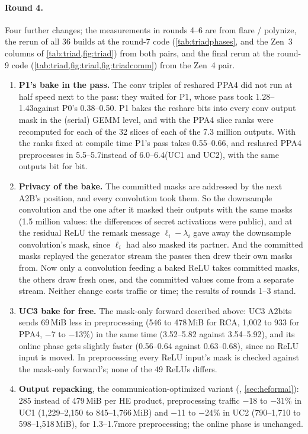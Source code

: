 \paragraph{Round 4.}\label{sec:triadround4} Four further changes; the measurements in rounds 4--6 are from flare /
polynize, the rerun of all 36 builds at the round-7 code (\cref{tab:triadphases}, and the Zen~3 columns of
\cref{tab:triad,fig:triad}) from both pairs, and the final rerun at the round-9 code (\cref{tab:triad,fig:triad,fig:triadcomm})
from the Zen~4 pair.
\begin{enumerate}\itemsep1pt
\item \textbf{P1's bake in the pass.} The conv triples of reshared PPA4 did not run at half speed next to the pass:
  they waited for P1, whose pass took 1.28--1.43\s against P0's 0.38--0.50\s. P1 bakes the reshare bits into every
  conv output mask in the (serial) GEMM level, and with  the PPA4 slice ranks were
  recomputed for each of the 32 slices of each of the 7.3 million outputs. With the ranks fixed at compile time P1's
  pass takes 0.55--0.66\s, and reshared PPA4 preprocesses in 5.5--5.7\s instead of 6.0--6.4\s (UC1 and UC2), with the
  same outputs bit for bit.
\item \textbf{Privacy of the bake.} The committed masks are addressed by the next A2B's position, and every
  convolution took them. So the downsample convolution and the one after it masked their outputs with the same masks
  (1.5 million values: the differences of secret activations were public), and at the residual ReLU the remask
  message $\ell_i - \lambda_i$ gave away the downsample convolution's mask, since $\ell_i$ had also masked its
  partner. And the committed masks replayed the generator stream the passes then drew their own masks from. Now only
  a convolution feeding a baked ReLU takes committed masks, the others draw fresh ones, and the committed values come
  from a separate stream. Neither change costs traffic or time; the results of rounds 1--3 stand.
\item \textbf{UC3 bake for free.} The mask-only forward described above: UC3 A2bits sends 69\,MiB less in
  preprocessing (546 to 478\,MiB for RCA, 1{,}002 to 933 for PPA4, $-$7 to $-$13\%) in the same time (3.52--5.82
  against 3.54--5.92\s), and its online phase gets slightly faster (0.56--0.64 against 0.63--0.68\s), since no ReLU
  input is moved. In preprocessing every ReLU input's mask is checked against the mask-only forward's; none of the
  49 ReLUs differs.
\item \textbf{Output repacking}, the communication-optimized variant (,
  \cref{sec:heformal}): 285 instead of 479\,MiB per HE product, preprocessing traffic $-$18 to $-$31\% in UC1 (1{,}229--2{,}150
  to 845--1{,}766\,MiB) and $-$11 to $-$24\% in UC2 (790--1{,}710 to 598--1{,}518\,MiB), for 1.3--1.7\s more
  preprocessing; the online phase is unchanged.
\end{enumerate}

